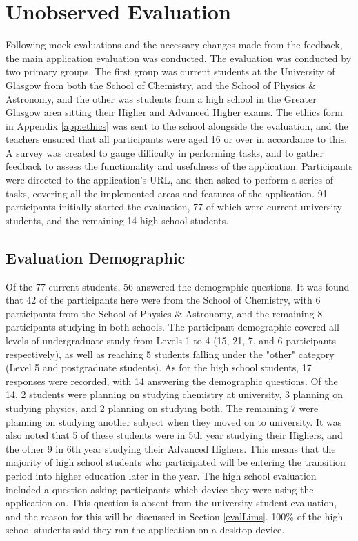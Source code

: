 \documentclass{l4proj}
\begin{document}
\section{Unobserved Evaluation}
Following mock evaluations and the necessary changes made from the feedback,  the main application evaluation was conducted. The evaluation was conducted by two primary groups. The first group was current students at the University of Glasgow from both the School of Chemistry,  and the School of Physics \& Astronomy,  and the other was students from a high school in the Greater Glasgow area sitting their Higher and Advanced Higher exams. The ethics form in Appendix \ref{app:ethics} was sent to the school alongside the evaluation,  and the teachers ensured that all participants were aged 16 or over in accordance to this. A survey was created to gauge difficulty in performing tasks, and to gather feedback to assess the functionality and usefulness of the application. Participants were directed to the application's URL, and then asked to perform a series of tasks,  covering all the implemented areas and features of the application. 91 participants initially started the evaluation,  77 of which were current university students,  and the remaining 14 high school students.

\subsection{Evaluation Demographic}
Of the 77 current students,  56 answered the demographic questions. It was found that 42 of the participants here were from the School of Chemistry,  with 6 participants from the School of Physics \& Astronomy,  and the remaining 8 participants studying in both schools. The participant demographic covered all levels of undergraduate study from Levels 1 to 4 (15,  21,  7,  and 6 participants respectively),  as well as reaching 5 students falling under the "other" category (Level 5 and postgraduate students). As for the high school students,  17 responses were recorded,  with 14 answering the demographic questions. Of the 14,  2 students were planning on studying chemistry at university,  3 planning on studying physics,  and 2 planning on studying both. The remaining 7 were planning on studying another subject when they moved on to university. It was also noted that 5 of these students were in 5th year studying their Highers,  and the other 9 in 6th year studying their Advanced Highers. This means that the majority of high school students who participated will be entering the transition period into higher education later in the year. The high school evaluation included a question asking participants which device they were using the application on. This question is absent from the university student evaluation,  and the reason for this will be discussed in Section \ref{evalLims}. 100\% of the high school students said they ran the application on a desktop device.
\end{document}
